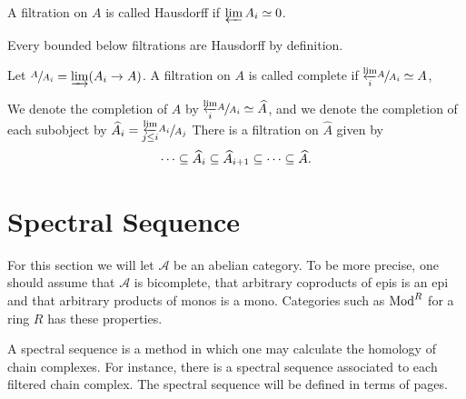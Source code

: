 \documentclass[../thesis.tex]{subfiles}
\begin{document}
        \begin{definition}
            A filtration on $A$ is called Hausdorff if $\varprojlim A_i \simeq 0$.
        \end{definition}

        Every bounded below filtrations are Hausdorff by definition.

        \begin{definition}
            Let $\sfrac{A}{A_i} = \varinjlim(A_i \rightarrow A)$. A filtration on $A$ is called complete if $\substack{\varprojlim \\ i} \sfrac{A}{A_i} \simeq A$,
            \begin{center}
            \end{center}
        \end{definition}
        
        We denote the completion of $A$ by $\substack{\varprojlim \\ i} \sfrac{A}{A_i} \simeq \widehat{A}$, and we denote the completion of each subobject by $\widehat{A}_i = \substack{\varprojlim \\ j \leq i} \sfrac{A_i}{A_j}$ There is a filtration on $\widehat{A}$ given by
        \begin{align*}
            \cdots \subseteq \widehat{A}_i \subseteq \widehat{A}_{i+1} \subseteq \cdots \subseteq \widehat{A}\tt{.}
        \end{align*}

    \section{Spectral Sequence}
    
        For this section we will let $\mathcal{A}$ be an abelian category. To be more precise, one should assume that $\mathcal{A}$ is bicomplete, that arbitrary coproducts of epis is an epi and that arbitrary products of monos is a mono. Categories such as $\tt{Mod}^R$ for a ring $R$ has these properties.

        A spectral sequence is a method in which one may calculate the homology of chain complexes. For instance, there is a spectral sequence associated to each filtered chain complex. The spectral sequence will be defined in terms of pages.
\end{document}

